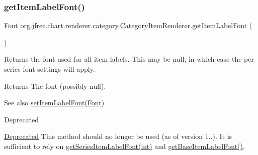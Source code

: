 \subsubsection{\texorpdfstring{get\+Item\+Label\+Font()}{getItemLabelFont()}\hspace{0.1cm}{\footnotesize\ttfamily [2/2]}}
{\footnotesize\ttfamily Font org.\+jfree.\+chart.\+renderer.\+category.\+Category\+Item\+Renderer.\+get\+Item\+Label\+Font (\begin{DoxyParamCaption}{ }\end{DoxyParamCaption})}

Returns the font used for all item labels. This may be {\ttfamily null}, in which case the per series font settings will apply.

\begin{DoxyReturn}{Returns}
The font (possibly {\ttfamily null}).
\end{DoxyReturn}
\begin{DoxySeeAlso}{See also}
\mbox{\hyperlink{interfaceorg_1_1jfree_1_1chart_1_1renderer_1_1category_1_1_category_item_renderer_a685e145a5b47946554cc764973ace150}{set\+Item\+Label\+Font(\+Font)}}
\end{DoxySeeAlso}
\begin{DoxyRefDesc}{Deprecated}
\item[\mbox{\hyperlink{deprecated__deprecated000170}{Deprecated}}]This method should no longer be used (as of version 1..). It is sufficient to rely on \mbox{\hyperlink{interfaceorg_1_1jfree_1_1chart_1_1renderer_1_1category_1_1_category_item_renderer_a7e2dd43c2b47d951c69a365266cdc281}{get\+Series\+Item\+Label\+Font(int)}} and \mbox{\hyperlink{interfaceorg_1_1jfree_1_1chart_1_1renderer_1_1category_1_1_category_item_renderer_a4383cfd603df36a6ca4b5f02c5ca6f48}{get\+Base\+Item\+Label\+Font()}}. \end{DoxyRefDesc}
\mbox{\label{interfaceorg_1_1jfree_1_1chart_1_1renderer_1_1category_1_1_category_item_renderer_a04320f200d3febfed424b954266b114c}} 
